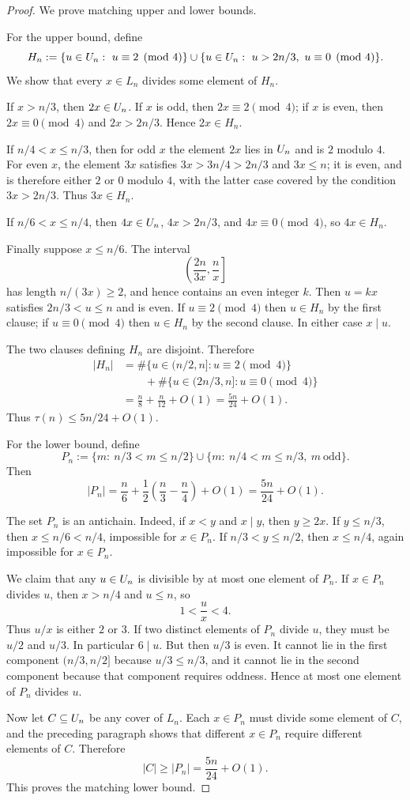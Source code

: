 \begin{proof}
We prove matching upper and lower bounds.

For the upper bound, define
\[
  H_n
  :=
  \{u\in U_n:\ u\equiv2\pmod4\}
  \cup
  \{u\in U_n:\ u>2n/3,\ u\equiv0\pmod4\}.
\]
We show that every $x\in L_n$ divides some element of $H_n$.

If $x>n/3$, then $2x\in U_n$.  If $x$ is odd, then $2x\equiv2\pmod4$; if
$x$ is even, then $2x\equiv0\pmod4$ and $2x>2n/3$.  Hence $2x\in H_n$.

If $n/4<x\le n/3$, then for odd $x$ the element $2x$ lies in $U_n$ and is
$2$ modulo $4$.  For even $x$, the element $3x$ satisfies
$3x>3n/4>2n/3$ and $3x\le n$; it is even, and is therefore either $2$ or $0$
modulo $4$, with the latter case covered by the condition $3x>2n/3$.  Thus
$3x\in H_n$.

If $n/6<x\le n/4$, then $4x\in U_n$, $4x>2n/3$, and $4x\equiv0\pmod4$, so
$4x\in H_n$.

Finally suppose $x\le n/6$.  The interval
\[
  \left(\frac{2n}{3x},\frac nx\right]
\]
has length $n/(3x)\ge2$, and hence contains an even integer $k$.  Then
$u=kx$ satisfies $2n/3<u\le n$ and is even.  If $u\equiv2\pmod4$ then
$u\in H_n$ by the first clause; if $u\equiv0\pmod4$ then $u\in H_n$ by the
second clause.  In either case $x\mid u$.

The two clauses defining $H_n$ are disjoint.  Therefore
\[
  \begin{aligned}
  |H_n|
  &=
  \#\{u\in(n/2,n]:u\equiv2\pmod4\} \\
  &\qquad+
  \#\{u\in(2n/3,n]:u\equiv0\pmod4\} \\
  &=
  \frac n8+\frac n{12}+O(1)
  =
  \frac{5n}{24}+O(1).
  \end{aligned}
\]
Thus $\tau(n)\le 5n/24+O(1)$.

For the lower bound, define
\[
  P_n
  :=
  \{m:\ n/3<m\le n/2\}
  \cup
  \{m:\ n/4<m\le n/3,\ m\ \text{odd}\}.
\]
Then
\[
  |P_n|=\frac n6+\frac12\left(\frac n3-\frac n4\right)+O(1)
  =
  \frac{5n}{24}+O(1).
\]

The set $P_n$ is an antichain.  Indeed, if $x<y$ and $x\mid y$, then
$y\ge2x$.  If $y\le n/3$, then $x\le n/6<n/4$, impossible for
$x\in P_n$.  If $n/3<y\le n/2$, then $x\le n/4$, again impossible for
$x\in P_n$.

We claim that any $u\in U_n$ is divisible by at most one element of $P_n$.
If $x\in P_n$ divides $u$, then $x>n/4$ and $u\le n$, so
\[
  1<\frac ux<4.
\]
Thus $u/x$ is either $2$ or $3$.  If two distinct elements of $P_n$ divide
$u$, they must be $u/2$ and $u/3$.  In particular $6\mid u$.  But then
$u/3$ is even.  It cannot lie in the first component $(n/3,n/2]$ because
$u/3\le n/3$, and it cannot lie in the second component because that component
requires oddness.  Hence at most one element of $P_n$ divides $u$.

Now let $C\subseteq U_n$ be any cover of $L_n$.  Each $x\in P_n$ must divide
some element of $C$, and the preceding paragraph shows that different
$x\in P_n$ require different elements of $C$.  Therefore
\[
  |C|\ge |P_n|=\frac{5n}{24}+O(1).
\]
This proves the matching lower bound.
\end{proof}
